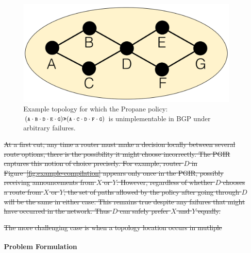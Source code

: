 \documentclass{sig-alternate-10pt}
\newcommand{\sysname}{{\small \sf Propane}\xspace}
\newcommand{\para}[1]{\paragraph*{\textbf{#1}}}
\newcommand{\CD}[1]{\texttt{\small #1}}  %
\newcommand{\Prefer}{\texttt{>>}}
\providecommand{\DIFdel}[1]{{\protect\color{red}\sout{#1}}}                      %
\providecommand{\DIFaddbegin}{} %
\providecommand{\DIFaddend}{} %
\providecommand{\DIFdelbegin}{} %
\providecommand{\DIFdelend}{} %
\begin{document}
\DIFaddbegin \begin{figure}[t!]
  \centering
  \includegraphics[width=.8\columnwidth]{figures/unimplementable}
  \caption{Example topology for which the \sysname policy: $(\CD{A} \cdot \CD{B} \cdot \CD{D} \cdot \CD{E} \cdot \CD{G}) \Prefer (\CD{A} \cdot \CD{C} \cdot \CD{D} \cdot \CD{F} \cdot \CD{G})$ is unimplementable in BGP under arbitrary failures.}
  \label{fig:unimplementable}
\end{figure}
\DIFaddend 


\DIFdelbegin \DIFdel{At a first cut, any time a router must make a decision locally between several route options, there is the possibility it might choose incorrectly. The PGIR captures this notion of choice precisely. For example, router $D$ in Figure~\ref{fig:example-compilation} appears only once in the PGIR, possibly receiving announcements from $X$ or $Y$. However, regardless of whether $D$ chooses a route from $X$ or $Y$, the set of paths allowed by the policy after going through $D$ will be the same in either case. This remains true despite any failures that might have occurred in the network. Thus $D$ can safely prefer $X$ and $Y$ equally.
}%

\DIFdel{The more challenging case is when a topology location occurs in mutliple }\DIFdelend \DIFaddbegin \para{Problem Formulation}
\end{document}
